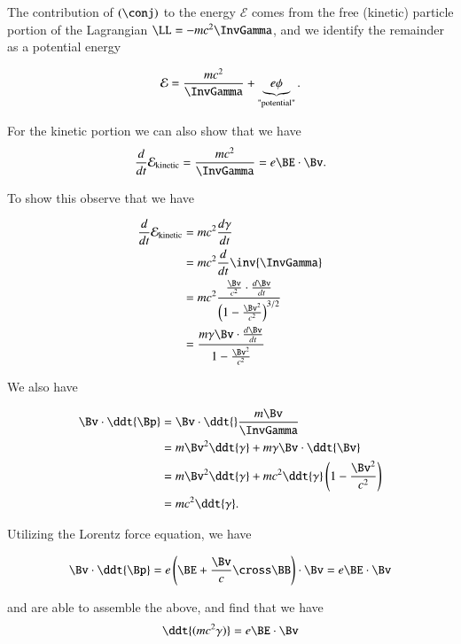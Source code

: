 The contribution of $(\conj)$ to the energy $\mathcal{E}$ comes from the free (kinetic) particle portion of the Lagrangian $\LL = -m c^2 \InvGamma$, and we identify the remainder as a potential energy 

\begin{equation}\label{eqn:relativisticElectrodynamicsL10:230}
\mathcal{E} = \frac{m c^2}{\InvGamma} + \underbrace{e \phi}_{\text{"potential"}}.
\end{equation}

For the kinetic portion we can also show that we have
\begin{equation}\label{eqn:relativisticElectrodynamicsL10:250}
\frac{d}{dt} \mathcal{E}_{\text{kinetic}} 
=
\frac{m c^2}{\InvGamma} 
= e \BE \cdot \Bv.
\end{equation}

To show this observe that we have

\begin{align*}
\frac{d}{dt} \mathcal{E}_{\text{kinetic}} 
&= m c^2 \frac{d\gamma}{dt} \\
&= m c^2 \frac{d}{dt} \inv{\InvGamma} \\
&= m c^2 \frac{\frac{\Bv}{c^2} \cdot \frac{d\Bv}{dt}}{\left(1 - \frac{\Bv^2}{c^2}\right)^{3/2}} \\
&= \frac{m \gamma \Bv \cdot \frac{d\Bv}{dt}}{1 - \frac{\Bv^2}{c^2}}
\end{align*}

We also have

\begin{align*}
\Bv \cdot \ddt{\Bp} 
&= \Bv \cdot \ddt{} \frac{m \Bv}{\InvGamma} \\
&= m\Bv^2 \ddt{\gamma} + m \gamma \Bv \cdot \ddt{\Bv} \\
&= m\Bv^2 \ddt{\gamma} + m c^2 \ddt{\gamma} \left( 1 - \frac{\Bv^2}{c^2} \right) \\
&= m c^2 \ddt{\gamma}.
\end{align*}

Utilizing the Lorentz force equation, we have

\begin{equation}\label{eqn:relativisticElectrodynamicsL10:270}
\Bv \cdot \ddt{\Bp} = e \left( \BE + \frac{\Bv}{c} \cross \BB \right) \cdot \Bv = e \BE \cdot \Bv
\end{equation}

and are able to assemble the above, and find that we have
\begin{equation}\label{eqn:relativisticElectrodynamicsL10:290}
\ddt{(m c^2 \gamma)} = e \BE \cdot \Bv 
\end{equation}

